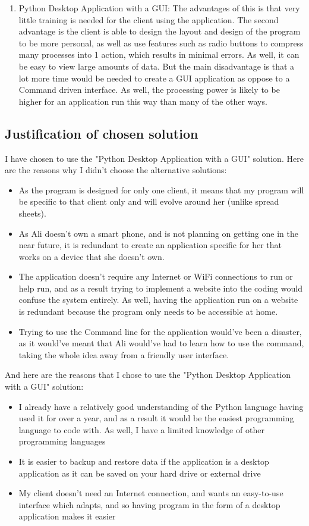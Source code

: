 \begin{enumerate}
\item Python Desktop Application with a GUI: The advantages of this is that very little training is needed for the client using the application. The second advantage is the client is able to design the layout and design of the program to be more personal, as well as use features such as radio buttons to compress many processes into 1 action, which results in minimal errors. As well, it can be easy to view large amounts of data. But the main disadvantage is that a lot more time would be needed to create a GUI application as oppose to a Command driven interface. As well, the processing power is likely to be higher for an application run this way than many of the other ways.
\end{enumerate}

\subsection{Justification of chosen solution}
I have chosen to use the "Python Desktop Application with a GUI" solution.
Here are the reasons why I didn't choose the alternative solutions:

\begin{itemize}
\item As the program is designed for only one client,  it means that my program will be specific to that client only and will evolve around her (unlike spread sheets).
\item As Ali doesn't own a smart phone, and is not planning on getting one in the near future, it is redundant to create an application specific for her that works on a device that she doesn't own.
\item The application doesn't require any Internet or WiFi connections to run or help run, and as a result trying to implement a website into the coding would confuse the system entirely. As well, having the application run on a website is redundant because the program only needs to be accessible at home.
\item Trying to use the Command line for the application would've been a disaster, as it would've meant that Ali would've had to learn how to use the command, taking the whole idea away from a friendly user interface.
\end{itemize}

And here are the reasons that I chose to use the "Python Desktop Application with a GUI" solution:

\begin{itemize}
\item I already have a relatively good understanding of the Python language having used it for over a year, and as a result it would be the easiest programming language to code with. As well, I have a limited knowledge of other programming languages
\item It is easier to backup and restore data if the application is a desktop application as it can be saved on your hard drive or external drive
\item My client doesn't need an Internet connection, and wants an easy-to-use interface which adapts, and so having program in the form of a desktop application makes it easier
\end{itemize}